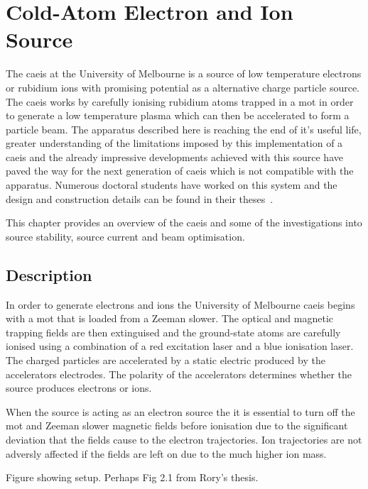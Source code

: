 \chapter{Cold-Atom Electron and Ion Source}\label{chapter:setup}

The \gls{caeis} at the University of Melbourne is a source of low temperature electrons or rubidium ions with promising potential as a alternative charge particle source.
The \gls{caeis} works by carefully ionising rubidium atoms trapped in a \gls{mot} in order to generate a low temperature plasma which can then be accelerated to form a particle beam.
The apparatus described here is reaching the end of it's useful life, greater understanding of the limitations imposed by this implementation of a \gls{caeis} and the already impressive developments achieved with this source have paved the way for the next generation of \gls{caeis} which is not compatible with the apparatus.
Numerous doctoral students have worked on this system and the design and construction details can be found in their theses~\cite{sheludko_shaped_2010,bell_cold_2011,saliba_cold_2011,mcculloch_generation_2013,murphy_measurement_2017,rory_thesis}.

This chapter provides an overview of the \gls{caeis} and some of the investigations into source stability, source current and beam optimisation.

\section{Description}
In order to generate electrons and ions the University of Melbourne \gls{caeis} begins with a \gls{mot} that is loaded from a Zeeman slower.
The optical and magnetic trapping fields are then extinguised and the ground-state atoms are carefully ionised using a combination of a red excitation laser and a blue ionisation laser.
The charged particles are accelerated by a static electric produced by the accelerators electrodes.
The polarity of the accelerators determines whether the source produces electrons or ions.

When the source is acting as an electron source the it is essential to turn off the \gls{mot} and Zeeman slower magnetic fields before ionisation due to the significant deviation that the fields cause to the electron trajectories.
Ion trajectories are not adversly affected if the fields are left on due to the much higher ion mass.

{\color{red}Figure showing setup. Perhaps Fig 2.1 from Rory's thesis.}

